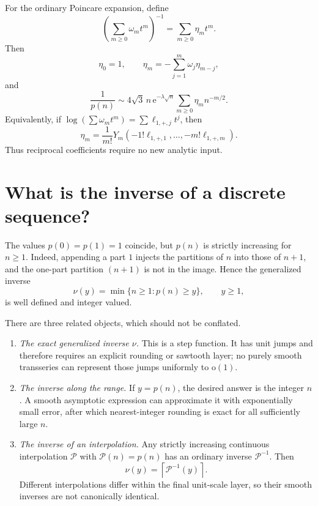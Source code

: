\documentclass[11pt,a4paper]{article}
\numberwithin{equation}{section}
\theoremstyle{remark}
\newcommand{\e}{\mathrm e}
\newcommand{\Pcal}{\mathcal P}
\newcommand{\smallO}{\mathrm o}
\begin{document}
For the ordinary Poincare expansion, define
\begin{equation}
 \left(\sum_{m\ge0}\omega_mt^m\right)^{-1}
 =\sum_{m\ge0}\eta_mt^m.
\end{equation}
Then
\begin{equation}\label{eq:eta-recurrence}
 \eta_0=1,\qquad
 \eta_m=-\sum_{j=1}^{m}\omega_j\eta_{m-j},
\end{equation}
and
\begin{equation}\label{eq:reciprocal-poincare}
 \frac1{p(n)}\sim 4\sqrt3\,n\,\e^{-\lambda\sqrt n}
 \sum_{m\ge0}\eta_mn^{-m/2}.
\end{equation}
Equivalently, if $\log(\sum\omega_mt^m)=\sum\ell_{1,+,j}t^j$, then
\begin{equation}
 \eta_m=\frac1{m!}Y_m(-1!\ell_{1,+,1},\ldots,-m!\ell_{1,+,m}).
\end{equation}
Thus reciprocal coefficients require no new analytic input.

\section{What is the inverse of a discrete sequence?}\label{sec:meaning-inverse}

The values $p(0)=p(1)=1$ coincide, but $p(n)$ is strictly increasing for $n\ge1$.  Indeed, appending a part $1$ injects the partitions of $n$ into those of $n+1$, and the one-part partition $(n+1)$ is not in the image.  Hence the generalized inverse
\begin{equation}\label{eq:generalized-inverse}
 \nu(y)=\min\{n\ge1:p(n)\ge y\},\qquad y\ge1,
\end{equation}
is well defined and integer valued.

There are three related objects, which should not be conflated.

\begin{enumerate}
\item \emph{The exact generalized inverse $\nu$.}  This is a step function.  It has unit jumps and therefore requires an explicit rounding or sawtooth layer; no purely smooth transseries can represent those jumps uniformly to $\smallO(1)$.
\item \emph{The inverse along the range.}  If $y=p(n)$, the desired answer is the integer $n$.  A smooth asymptotic expression can approximate it with exponentially small error, after which nearest-integer rounding is exact for all sufficiently large $n$.
\item \emph{The inverse of an interpolation.}  Any strictly increasing continuous interpolation $\Pcal$ with $\Pcal(n)=p(n)$ has an ordinary inverse $\Pcal^{-1}$.  Then
\begin{equation}\label{eq:ceil-interpolation}
 \nu(y)=\left\lceil\Pcal^{-1}(y)\right\rceil.
\end{equation}
Different interpolations differ within the final unit-scale layer, so their smooth inverses are not canonically identical.
\end{enumerate}
\end{document}
